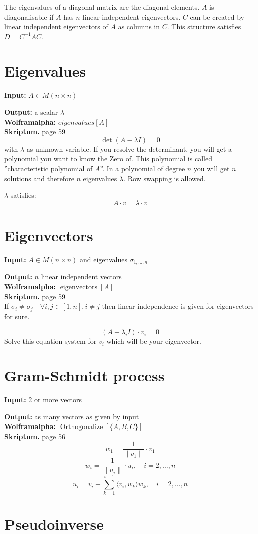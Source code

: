\documentclass[a4paper,twocolumn]{article}
\newcommand{\io}[2]{{\par\noindent\textbf{Input:} #1 \\}{\textbf{Output:} #2 \\}}
\newcommand{\wa}[1]{\textbf{Wolframalpha:} $#1$ \\}
\newcommand{\scriptref}[1]{\textbf{Skriptum.} page #1 \\}
\begin{document}
The eigenvalues of a diagonal matrix are the diagonal elements.
$A$ is diagonalisable if $A$ has $n$ linear independent eigenvectors.
$C$ can be created by linear independent eigenvectors of $A$ as
columns in $C$. This structure satisfies $D = C^{-1} AC$.

\section{Eigenvalues}

\io{$A \in M(n\times n)$}{a scalar $\lambda$}
\wa{eigenvalues[A]}
\scriptref{59}
%
\[
    \det{(A - \lambda I)} = 0
\]
with $\lambda$ as unknown variable. If you resolve the determinant,
you will get a polynomial you want to know the Zero of. This polynomial
is called ''characteristic polynomial of $A$''. In a polynomial of
degree $n$ you will get $n$ solutions and therefore $n$ eigenvalues
$\lambda$.
Row swapping is allowed.

$\lambda$ satisfies:
\[
    A\cdot v = \lambda\cdot v
\]

\section{Eigenvectors}

\io{$A \in M(n\times n)$ and eigenvalues $\sigma_{1,\ldots,n}$}
   {$n$ linear independent vectors}
\wa{\operatorname{eigenvectors}[A]}
\scriptref{59}

If $\sigma_{i} \neq \sigma_j \quad\forall i, j \in [1,n], i \neq j$
then linear independence is given for eigenvectors for sure.

\[
    (A - \lambda_i I) \cdot v_i = 0
\]
Solve this equation system for $v_i$ which will be your eigenvector.

\section{Gram-Schmidt process}

\io{2 or more vectors}{as many vectors as given by input}
\wa{\operatorname{Orthogonalize}[\{A,B,C\}]}
\scriptref{56}
%
\[
    w_1 = \frac{1}{\| v_1\|}\cdot v_1
\] \[
    w_i = \frac{1}{\| u_i\|}\cdot u_i, \quad i = 2,\ldots,n
\] \[
    u_i = v_i - \sum_{k=1}^{i-1} \langle v_i, w_k\rangle w_k, \quad i = 2,\ldots,n
\]

\section{Pseudoinverse}
\end{document}
